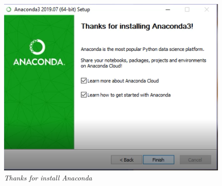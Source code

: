 \begin{enumerate}
\begin{figure}[H]
    \centering
    \includegraphics[scale=0.5]{figures/11}
    \caption{\textit{Thanks for install Anaconda}}
    \label{Figureanaconda70}
\end{figure}
\end{enumerate}

